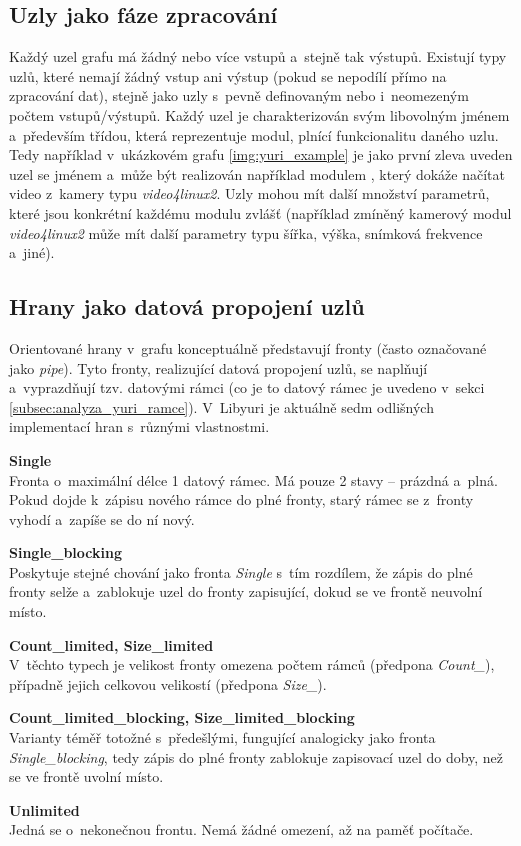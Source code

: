 \documentclass[thesis=M,czech]{FITthesis}[2012/06/26]
\begin{document}
\subsection{Uzly jako fáze zpracování} \label{subsec:analyza_yuri_uzly}
Každý uzel grafu má žádný nebo více vstupů a~stejně tak výstupů. Existují typy uzlů, které nemají žádný vstup ani výstup (pokud se nepodílí přímo na zpracování dat), stejně jako uzly s~pevně definovaným nebo i~neomezeným počtem vstupů/výstupů. Každý uzel je charakterizován svým libovolným jménem a~především třídou, která reprezentuje modul, plnící funkcionalitu daného uzlu. Tedy například v~ukázkovém grafu \ref{img:yuri_example} je jako první zleva uveden uzel se jménem  a~může být realizován například modulem , který dokáže načítat video z~kamery typu \textit{video4linux2}. Uzly mohou mít další množství parametrů, které jsou konkrétní každému modulu zvlášť (například zmíněný kamerový modul \textit{video4linux2} může mít další parametry typu šířka, výška, snímková frekvence a~jiné).

\subsection{Hrany jako datová propojení uzlů} \label{subsec:analyza_yuri_hrany}
Orientované hrany v~grafu konceptuálně představují fronty (často označované jako \textit{pipe}). Tyto fronty, realizující datová propojení uzlů, se naplňují a~vyprazdňují tzv. datovými rámci (co je to datový rámec je uvedeno v~sekci \ref{subsec:analyza_yuri_ramce}). V~Libyuri je aktuálně sedm odlišných implementací hran s~různými vlastnostmi.

\begin{description}
  \item \textbf{Single\\}
Fronta o~maximální délce 1 datový rámec. Má pouze 2 stavy -- prázdná a~plná. Pokud dojde k~zápisu nového rámce do plné fronty, starý rámec se z~fronty vyhodí a~zapíše se do ní nový.
  \item \textbf{Single\_blocking\\}
 Poskytuje stejné chování jako fronta \textit{Single} s~tím rozdílem, že zápis do plné fronty selže a~zablokuje uzel do fronty zapisující, dokud se ve frontě neuvolní místo.
  \item \textbf{Count\_limited, Size\_limited\\}
 V~těchto typech je velikost fronty omezena počtem rámců (předpona \textit{Count\_}), případně jejich celkovou velikostí (předpona \textit{Size\_}).
  \item \textbf{Count\_limited\_blocking, Size\_limited\_blocking\\}
  Varianty téměř totožné s~předešlými, fungující analogicky jako fronta \textit{Single\_blocking}, tedy zápis do plné fronty zablokuje zapisovací uzel do doby, než se ve frontě uvolní místo.
  \item \textbf{Unlimited\\}
Jedná se o~nekonečnou frontu. Nemá žádné omezení, až na paměť počítače.
\end{description}
\end{document}
